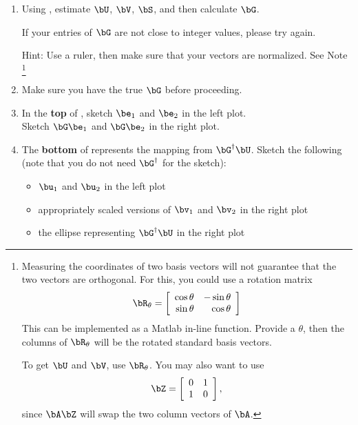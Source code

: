 \documentclass[11pt,titlepage,fleqn]{article}
\begin{document}
\begin{enumerate}
\item Using , estimate $\bU$, $\bV$, $\bS$, and then calculate $\bG$.

If your entries of $\bG$ are not close to integer values, please try again.

Hint: Use a ruler, then make sure that your vectors are normalized. See Note \footnote{
Measuring the coordinates of two basis vectors will not guarantee that the two vectors are orthogonal. For this, you could use a rotation matrix
%
\begin{equation}
\bR_\theta = \left[
\begin{array}{rr}
\cos\theta & -\sin\theta \\ 
\sin\theta & \cos\theta
\end{array}
\right]
\end{equation}
%
This can be implemented as a Matlab in-line function. Provide a $\theta$, then the columns of $\bR_\theta$ will be the rotated standard basis vectors.

To get $\bU$ and $\bV$, use $\bR_\theta$. You may also want to use
%
\begin{equation}
\bZ = \left[
\begin{array}{rr}
0 & 1 \\ 
1 & 0
\end{array}
\right],
\end{equation}
%
since $\bA\bZ$ will swap the two column vectors of $\bA$.
}

\item Make sure you have the true $\bG$ before proceeding.

\item In the {\bf top} of , sketch $\be_1$ and $\be_2$ in the left plot. \\
Sketch $\bG\be_1$ and $\bG\be_2$ in the right plot.

\item The {\bf bottom} of  represents the mapping from $\bG^{\dagger}\bU$. Sketch the following (note that you do not need $\bG^{\dagger}$ for the sketch):
%
\begin{itemize}
\item $\bu_1$ and $\bu_2$ in the left plot
\item appropriately scaled versions of $\bv_1$ and $\bv_2$ in the right plot
\item the ellipse representing $\bG^{\dagger}\bU$ in the right plot
\end{itemize}


\end{enumerate}
\end{document}
